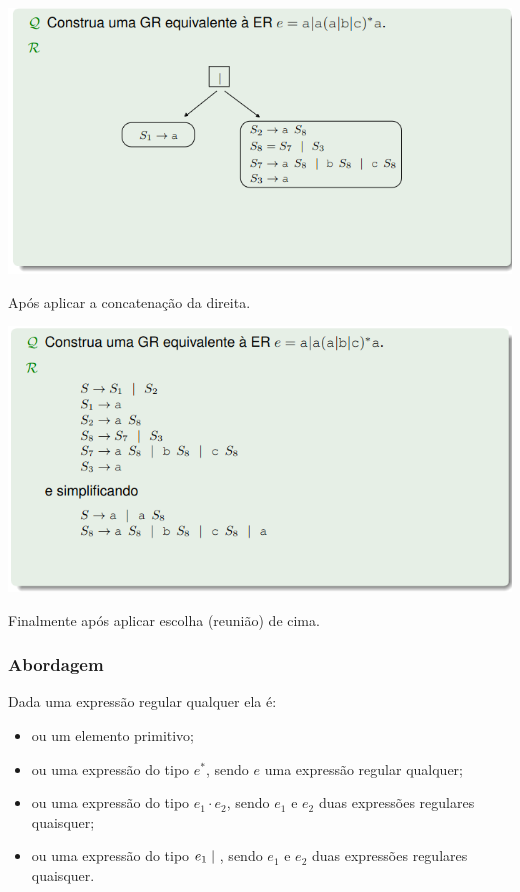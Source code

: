 \documentclass{article}
\begin{document}
\begin{flushleft}
  \begin{center}
    \includegraphics[scale=0.4]{20}
  \end{center}
  \item Após aplicar a concatenação da direita.


  \begin{center}
    \includegraphics[scale=0.4]{21}
  \end{center}
  \item Finalmente após aplicar escolha (reunião) de cima.

  \subsubsection{Abordagem}

  \item Dada uma expressão regular qualquer ela é:
  \begin{itemize}
    \item ou um elemento primitivo;
    \item ou uma expressão do tipo $e^*$, sendo $e$ uma expressão regular qualquer;
    \item ou uma expressão do tipo $e_1 \cdot e_2$, sendo $e_1$ e $e_2$ duas expressões regulares quaisquer;
    \item ou uma expressão do tipo $e_1 \hspace{1mm} | \hspace{1mm}$, sendo $e_1$ e $e_2$ duas expressões regulares quaisquer.
  \end{itemize}


\end{flushleft}
\end{document}

